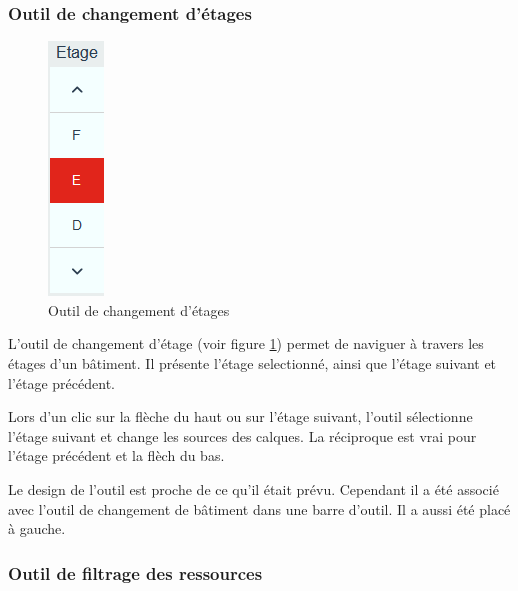 \documentclass[
    iai, %
    il, %
]{heig-tb}
\begin{document}
\subsubsection{Outil de changement d'étages}

\begin{figure}[h]
    \centering
    \includegraphics[scale=0.8]{frontend-floorChange.png}
    \caption{Outil de changement d'étages}
    \label{fig:changement-étage}
\end{figure}

L'outil de changement d'étage (voir figure \ref{fig:changement-étage}) permet de naviguer à travers les étages d'un bâtiment.
Il présente l'étage selectionné, ainsi que l'étage suivant et l'étage précédent.

Lors d'un clic sur la flèche du haut ou sur l'étage suivant, l'outil sélectionne l'étage suivant
et change les sources des calques. La réciproque est vrai pour l'étage précédent et la flèch du bas.

Le design de l'outil est proche de ce qu'il était prévu. Cependant il a été associé avec l'outil de changement de bâtiment dans une barre d'outil.
Il a aussi été placé à gauche.

\subsubsection{Outil de filtrage des ressources}
\end{document}
